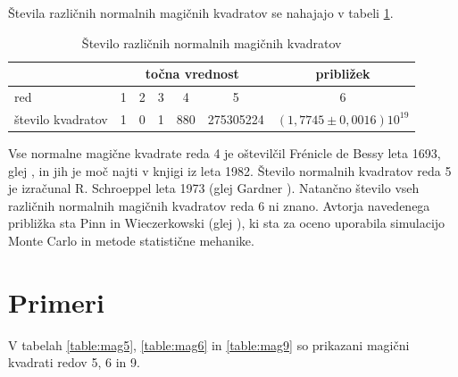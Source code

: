 \documentclass[a4paper,12pt]{article}
\begin{document}
Števila različnih normalnih magičnih kvadratov se nahajajo v tabeli \ref{table:stevila}.


\begin{table}
   \centering
   \caption{Število različnih normalnih magičnih kvadratov}
   \label{table:stevila}
   \begin{tabular}{lcccccc}\toprule
      & \multicolumn{5}{c}{točna vrednost} & približek \\ \midrule
      red & 1 & 2 & 3 & 4 & 5 & 6 \\
      število kvadratov & 1 & 0 & 1 & 880 & 275305224 & $(1,7745 \pm 0,0016)10^{19}$ \\ \bottomrule
   \end{tabular}
\end{table}

Vse normalne magične kvadrate reda 4 je oštevilčil Frénicle de Bessy
leta 1693, glej \cite{bessy}, in jih je moč najti v knjigi \cite{berlekamp}
iz leta 1982. Število normalnih kvadratov reda 5 je izračunal
R. Schroeppel leta 1973 (glej Gardner \cite{gardner}).
Natančno število vseh različnih normalnih magičnih kvadratov reda 6 ni znano.
Avtorja navedenega približka sta Pinn in Wieczerkowski (glej \cite{pinn}), ki
sta za oceno uporabila simulacijo Monte Carlo in metode statistične mehanike.


\section{Primeri}

V tabelah \ref{table:mag5}, \ref{table:mag6} in \ref{table:mag9} so prikazani
magični kvadrati redov 5, 6 in 9.
\end{document}
